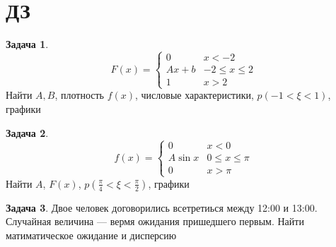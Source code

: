 \documentclass[english]{article}
\theoremstyle{plain}
\theoremstyle{remark}
\theoremstyle{definition}
\newtheorem{task}{Задача}
\begin{document}
\section{ДЗ}
\label{sec:orgceadee2}
\begin{task}
\[ F(x) = \begin{cases}
0 & x < -2 \\
Ax + b & -2 \le x \le 2 \\
1 & x > 2
\end{cases}\]
Найти \(A, B\),  плотность \(f(x)\), числовые характеристики, \(p(-1 < \xi < 1)\), графики
\end{task}
\begin{task}
\[ f(x) = \begin{cases}
0 & x < 0 \\
A \sin x & 0 \le x \le \pi \\
0 & x > \pi
\end{cases}\]
Найти \(A\), \(F(x)\), \(p(\frac{\pi}{4} < \xi < \frac{\pi}{2})\), графики
\end{task}
\begin{task}
Двое человек договорились всетретиься между 12:00 и 13:00. Случайная
величина --- вермя ожидания пришедшего первым. Найти матиматическое
ожидание и дисперсию
\end{task}
\end{document}
